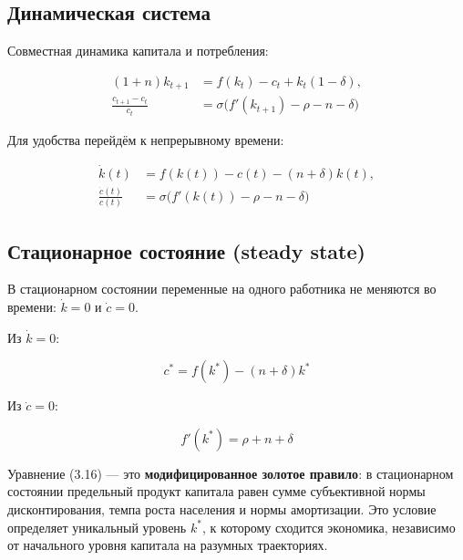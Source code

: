 \documentclass[10pt,a4paper]{article}
\begin{document}
\subsection{Динамическая система}

Совместная динамика капитала и потребления:
\begin{formulabox}
\begin{align*}
(1+n)k_{t+1} &= f(k_t) - c_t + k_t(1-\delta), \tag{3.5}\\
\frac{c_{t+1}-c_t}{c_t} &= \sigma\big(f'(k_{t+1}) - \rho - n - \delta\big) \tag{3.12}
\end{align*}
\end{formulabox}

Для удобства перейдём к непрерывному времени:
\begin{formulabox}
\begin{align}
\dot{k}(t) &= f(k(t)) - c(t) - (n+\delta)k(t), \tag{3.13}\\
\frac{\dot{c}(t)}{c(t)} &= \sigma\big(f'(k(t)) - \rho - n - \delta\big) \tag{3.14}
\end{align}
\end{formulabox}

\subsection{Стационарное состояние (steady state)}

В стационарном состоянии переменные на одного работника не меняются во времени: $\dot k = 0$ и $\dot c = 0$.

Из $\dot k = 0$:
\begin{formulabox}
\begin{equation}
c^{*} = f(k^{*}) - (n+\delta)k^{*} \tag{3.15}
\end{equation}
\end{formulabox}

Из $\dot c = 0$:
\begin{formulabox}
\begin{equation}
f'(k^{*}) = \rho + n + \delta \tag{3.16}
\end{equation}
\end{formulabox}

\begin{intuition}
Уравнение (3.16) — это \textbf{модифицированное золотое правило}: в стационарном состоянии предельный продукт капитала равен сумме субъективной нормы дисконтирования, темпа роста населения и нормы амортизации. Это условие определяет уникальный уровень $k^{*}$, к которому сходится экономика, независимо от начального уровня капитала на разумных траекториях.
\end{intuition}
\end{document}
